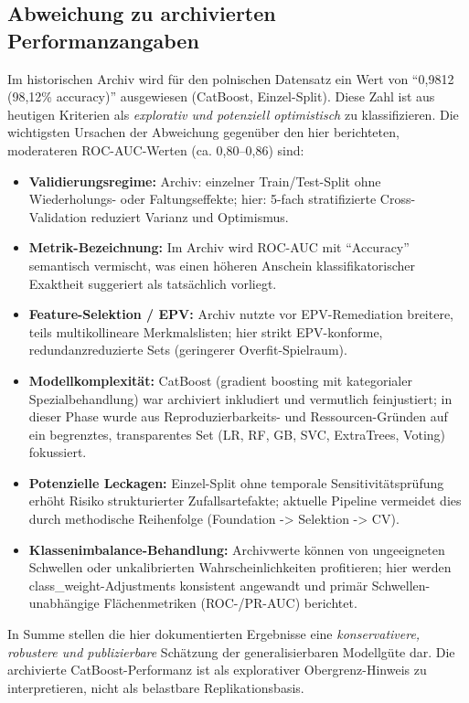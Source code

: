 \subsection*{Abweichung zu archivierten Performanzangaben}
Im historischen Archiv wird für den polnischen Datensatz ein Wert von ``0{,}9812 (98{,}12\% accuracy)'' ausgewiesen (CatBoost, Einzel-Split). Diese Zahl ist aus heutigen Kriterien als \emph{explorativ und potenziell optimistisch} zu klassifizieren. Die wichtigsten Ursachen der Abweichung gegenüber den hier berichteten, moderateren ROC-AUC-Werten (ca. 0{,}80--0{,}86) sind:
\begin{itemize}
	\item \textbf{Validierungsregime:} Archiv: einzelner Train/Test-Split ohne Wiederholungs- oder Faltungseffekte; hier: 5-fach stratifizierte Cross-Validation reduziert Varianz und Optimismus.
	\item \textbf{Metrik-Bezeichnung:} Im Archiv wird ROC-AUC mit ``Accuracy'' semantisch vermischt, was einen höheren Anschein klassifikatorischer Exaktheit suggeriert als tatsächlich vorliegt.
	\item \textbf{Feature-Selektion / EPV:} Archiv nutzte vor EPV-Remediation breitere, teils multikollineare Merkmalslisten; hier strikt EPV-konforme, redundanzreduzierte Sets (geringerer Overfit-Spielraum).
	\item \textbf{Modellkomplexität:} CatBoost (gradient boosting mit kategorialer Spezialbehandlung) war archiviert inkludiert und vermutlich feinjustiert; in dieser Phase wurde aus Reproduzierbarkeits- und Ressourcen-Gründen auf ein begrenztes, transparentes Set (LR, RF, GB, SVC, ExtraTrees, Voting) fokussiert.
	\item \textbf{Potenzielle Leckagen:} Einzel-Split ohne temporale Sensitivitätsprüfung erhöht Risiko strukturierter Zufallsartefakte; aktuelle Pipeline vermeidet dies durch methodische Reihenfolge (Foundation -> Selektion -> CV).
	\item \textbf{Klassenimbalance-Behandlung:} Archivwerte können von ungeeigneten Schwellen oder unkalibrierten Wahrscheinlichkeiten profitieren; hier werden class\_weight-Adjustments konsistent angewandt und primär Schwellen-unabhängige Flächenmetriken (ROC-/PR-AUC) berichtet.
\end{itemize}
In Summe stellen die hier dokumentierten Ergebnisse eine \emph{konservativere, robustere und publizierbare} Schätzung der generalisierbaren Modellgüte dar. Die archivierte CatBoost-Performanz ist als explorativer Obergrenz-Hinweis zu interpretieren, nicht als belastbare Replikationsbasis.
